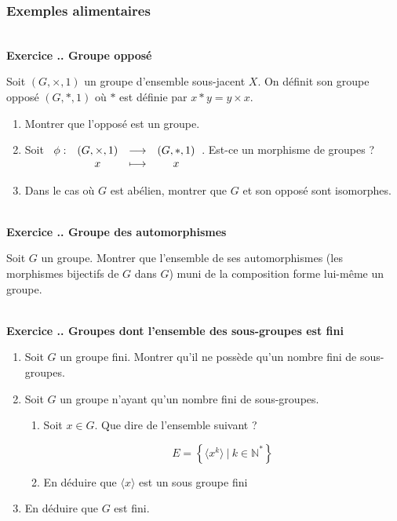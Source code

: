 \documentclass{article}
\newcommand{\fonction}[5]{\raisebox{-0.5\baselineskip}{$\begin{array}{lccc}
    #1: & #2 & \longrightarrow & #3 \\
        & #4 & \longmapsto & #5 \end{array}$}}
\newcommand{\mb}[1]{\mathbb{#1}}
\newcounter{exo}
\newcommand{\exercice}[1][\null]{\textbf{\\ Exercice \thesection.\theexo. #1} \addtocounter{exo}{1}}
\begin{document}
\subsubsection{Exemples alimentaires}

\exercice[Groupe opposé]

Soit $(G, \times, 1)$ un groupe d'ensemble sous-jacent $X$. On définit son groupe opposé $(G, *, 1)$ où $*$ est définie par $x*y = y \times x$.


\begin{enumerate}

\item  Montrer que l'opposé est un groupe.

\item Soit $\fonction{\phi}{(G, \times, 1)}{(G, *, 1)}{x}{x}$. Est-ce un morphisme de groupes ?

\item Dans le cas où $G$ est abélien, montrer que $G$ et son opposé sont isomorphes.
\end{enumerate}

\exercice[Groupe des automorphismes]


Soit $G$ un groupe. Montrer que l'ensemble de ses automorphismes (les morphismes bijectifs de $G$ dans $G$) muni de la composition forme lui-même un groupe.


\exercice[Groupes dont l'ensemble des sous-groupes est fini]

\begin{enumerate}

\item Soit $G$ un groupe fini. Montrer qu'il ne possède qu'un nombre fini de sous-groupes.

\item Soit $G$ un groupe n'ayant qu'un nombre fini de sous-groupes.

\begin{enumerate}

\item Soit $x \in G$. 
    Que dire de l'ensemble suivant ?

    \begin{equation*}
        E = \left\{ \langle x^k \rangle ~|~ k \in \mb{N}^*  \right\}
    \end{equation*}

\item En déduire que $\langle x \rangle$ est un sous groupe fini

\end{enumerate}

\item En déduire que $G$ est fini.

\end{enumerate}
\end{document}
